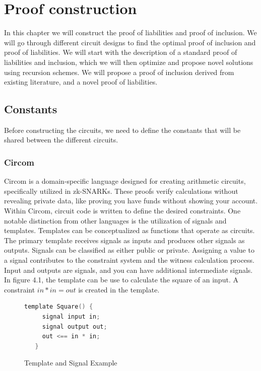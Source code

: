 
\chapter{Proof construction}
In this chapter we will construct the proof of liabilities and proof of inclusion. 
We will go through different circuit designs to find the optimal proof of inclusion and proof of liabilities.
We will start with the description of a standard proof of liabilities and inclusion, which we will then optimize and propose novel solutions using recursion schemes.
We will propose a proof of inclusion derived from existing literature, and a novel proof of liabilities. 


\section{Constants}
Before constructing the circuits, we need to define the constants that will be shared between the
different circuits.


\subsection{Circom} 

Circom is a domain-specific language designed for creating arithmetic circuits, specifically utilized in zk-SNARKs. These proofs verify calculations without revealing private data, like proving you have funds without showing your account.
Within Circom, circuit code is written to define the desired constraints. One notable distinction from other languages is the utilization of signals and templates.
Templates can be conceptualized as functions that operate as circuits. The primary template receives signals as inputs and produces other signals as outputs. Signals can be classified as either public or private.
Assigning a value to a signal contributes to the constraint system and the witness calculation process.
Input and outputs are signals, and you can have additional intermediate signals.
In figure 4.1, the template can be use to calculate the square of an input. A constraint $in * in = out$ is created in the template.

\begin{figure}[h]
   \centering
   \begin{lstlisting}[language=C, basicstyle=\ttfamily\small]
   template Square() {
     signal input in;
     signal output out;
     out <== in * in;
   }
   \end{lstlisting}
   \caption{Template and Signal Example}
   \label{fig:square}
   \end{figure}

